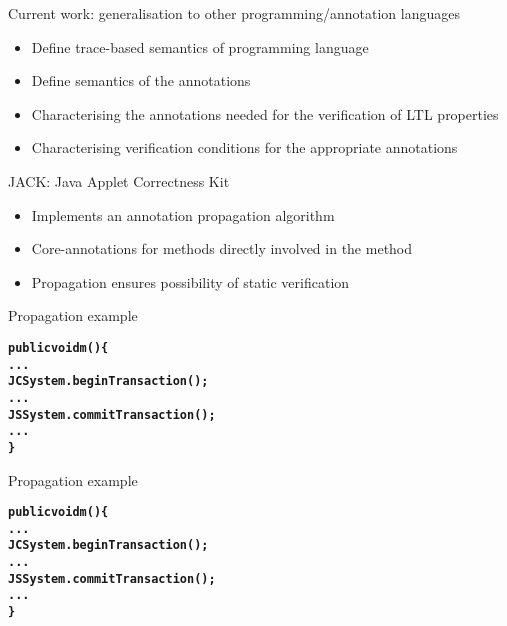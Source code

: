 \documentclass[final,nocolorBG,a4,marieke,nototal,ps, accumulate,slideColor]{prosper}
\begin{document}
\begin{slide}{Current work: generalisation to other
programming/annotation languages}
\begin{itemize}
\item Define trace-based semantics of programming language
\item Define semantics of the annotations
\item Characterising the annotations needed for the verification of
LTL properties
\item Characterising verification conditions for the appropriate
annotations
\end{itemize}
\end{slide}

\begin{slide}{JACK: Java Applet Correctness Kit}
\begin{itemize}
\item Implements an annotation propagation algorithm
\item Core-annotations for methods directly involved in the method
\item Propagation ensures possibility of static verification
\end{itemize}
\end{slide}

\begin{slide}{Propagation example}
\begin{alltt}
\textbf{public void m() \{
   ...
   JCSystem.beginTransaction();
   ...
   JSSystem.commitTransaction();
   ...
   \}}
\end{alltt}
\end{slide}

\begin{slide}{Propagation example}
\begin{alltt}
\textbf{
public void m() \{
   ...
   JCSystem.beginTransaction();
   ...
   JSSystem.commitTransaction();
   ...
   \}}
\end{alltt}
\end{slide}
\end{document}
